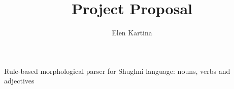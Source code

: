 \newcommand*{\rootdir}{./project_proposal}%



\title{\textbf{Project Proposal}}
\author{Elen Kartina}
\date{}


    \maketitle
    \thispagestyle{empty}
    \vspace{6cm}
    \begin{center}
        \LARGE Rule-based morphological parser for Shughni language: nouns, verbs and adjectives
    \end{center}
    \newpage

    \setcounter{page}{1}
    \tableofcontents
    \newpage

    
    
    
    
    
    
    
    

